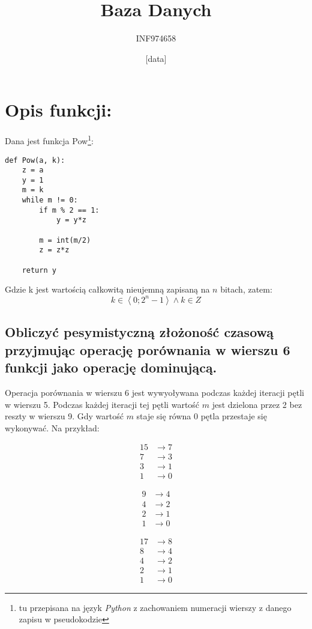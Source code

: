 \documentclass[a4paper,12pt]{article}
\title{Baza Danych}
\author{INF974658}
\date{[data]}
\begin{document}
\section*{Opis funkcji:}

Dana jest funkcja Pow\footnote{tu przepisana na język \emph{Python} z zachowaniem numeracji wierszy
z danego zapisu w pseudokodzie}:
\lstset{language = python,
	numbers = left,
	columns = fullflexible,
	frame = single}
	\begin{lstlisting}
def Pow(a, k):
	z = a
	y = 1
	m = k
	while m != 0:
		if m % 2 == 1:
			y = y*z
			
		m = int(m/2)
		z = z*z
		
	return y
	\end{lstlisting}
	
	Gdzie k jest wartością całkowitą nieujemną zapisaną na $n$ bitach, zatem:
	\[ k \in \left\langle 0 ; 2^n - 1 \right\rangle \wedge k \in Z\]
\subsection{Obliczyć pesymistyczną złożoność czasową przyjmując operację porównania w wierszu 6 funkcji
jako operację dominującą.}

Operacja porównania w wierszu 6 jest wywyoływana podczas każdej iteracji pętli w wierszu 5. Podczas każdej
iteracji tej pętli wartość $m$ jest dzielona przez 2 bez reszty w wierszu 9. Gdy wartość $m$ staje się równa 0
pętla przestaje się wykonywać. Na przykład:


\begin{minipage}[l]{0.3\textwidth}
\begin{align*}
		15 &\rightarrow 7 \\
		7 &\rightarrow 3 \\
		3 &\rightarrow 1 \\
		1 &\rightarrow 0 
\end{align*}
\end{minipage}
\begin{minipage}[l]{0.3\textwidth}
\begin{align*}
		9 &\rightarrow 4 \\
		4 &\rightarrow 2 \\
		2 &\rightarrow 1 \\
		1 &\rightarrow 0 
\end{align*}
\end{minipage}
\begin{minipage}[l]{0.3\textwidth}
\begin{align*}
		17 &\rightarrow 8 \\
		8 &\rightarrow 4 \\
		4 &\rightarrow 2 \\
		2 &\rightarrow 1 \\
		1 &\rightarrow 0 
\end{align*}
\end{minipage}
\end{document}
